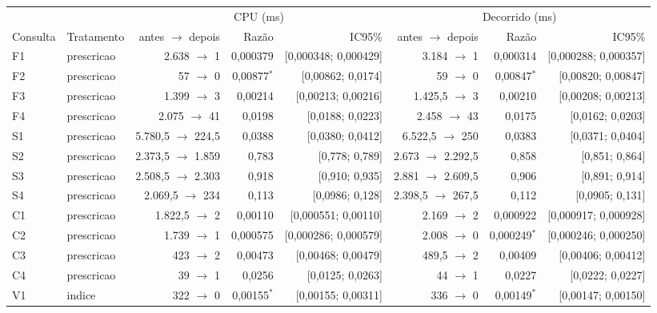 {\footnotesize\setlength{\tabcolsep}{4pt}
\begin{tabular}{llrrrrrr}
\toprule
 &  & \multicolumn{3}{c}{CPU (ms)} & \multicolumn{3}{c}{Decorrido (ms)} \\
\cmidrule(lr){3-5}\cmidrule(lr){6-8}
Consulta & Tratamento & antes $\to$ depois & Razão & IC95\% & antes $\to$ depois & Razão & IC95\% \\
\midrule
F1 & prescricao & 2.638 $\to$ 1 & 0,000379 & [0,000348; 0,000429] & 3.184 $\to$ 1 & 0,000314 & [0,000288; 0,000357] \\
F2 & prescricao & 57 $\to$ 0 & 0,00877$^{*}$ & [0,00862; 0,0174] & 59 $\to$ 0 & 0,00847$^{*}$ & [0,00820; 0,00847] \\
F3 & prescricao & 1.399 $\to$ 3 & 0,00214 & [0,00213; 0,00216] & 1.425,5 $\to$ 3 & 0,00210 & [0,00208; 0,00213] \\
F4 & prescricao & 2.075 $\to$ 41 & 0,0198 & [0,0188; 0,0223] & 2.458 $\to$ 43 & 0,0175 & [0,0162; 0,0203] \\
S1 & prescricao & 5.780,5 $\to$ 224,5 & 0,0388 & [0,0380; 0,0412] & 6.522,5 $\to$ 250 & 0,0383 & [0,0371; 0,0404] \\
S2 & prescricao & 2.373,5 $\to$ 1.859 & 0,783 & [0,778; 0,789] & 2.673 $\to$ 2.292,5 & 0,858 & [0,851; 0,864] \\
S3 & prescricao & 2.508,5 $\to$ 2.303 & 0,918 & [0,910; 0,935] & 2.881 $\to$ 2.609,5 & 0,906 & [0,891; 0,914] \\
S4 & prescricao & 2.069,5 $\to$ 234 & 0,113 & [0,0986; 0,128] & 2.398,5 $\to$ 267,5 & 0,112 & [0,0905; 0,131] \\
C1 & prescricao & 1.822,5 $\to$ 2 & 0,00110 & [0,000551; 0,00110] & 2.169 $\to$ 2 & 0,000922 & [0,000917; 0,000928] \\
C2 & prescricao & 1.739 $\to$ 1 & 0,000575 & [0,000286; 0,000579] & 2.008 $\to$ 0 & 0,000249$^{*}$ & [0,000246; 0,000250] \\
C3 & prescricao & 423 $\to$ 2 & 0,00473 & [0,00468; 0,00479] & 489,5 $\to$ 2 & 0,00409 & [0,00406; 0,00412] \\
C4 & prescricao & 39 $\to$ 1 & 0,0256 & [0,0125; 0,0263] & 44 $\to$ 1 & 0,0227 & [0,0222; 0,0227] \\
V1 & indice & 322 $\to$ 0 & 0,00155$^{*}$ & [0,00155; 0,00311] & 336 $\to$ 0 & 0,00149$^{*}$ & [0,00147; 0,00150] \\

\end{tabular}}
